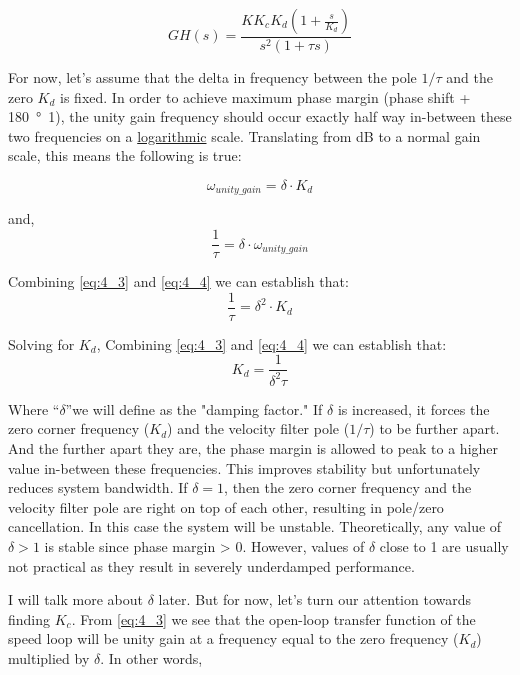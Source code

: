 \begin{equation}\label{eq:4_2}
    GH(s) = \frac{KK_cK_d\left(1+\frac{s}{K_d}\right)}{s^2 \left(1+\tau s\right)}
\end{equation}

For now, let’s assume that the delta in frequency between the pole $1/\tau$ and the zero $K_d$ is fixed.  In order to achieve maximum phase margin (phase shift + \qty{180}{\degree1}), the unity gain frequency should occur exactly half way in-between these two frequencies on a \underline{logarithmic} scale.  Translating from \unit{\dB} to a normal gain scale, this means the following is true:

\begin{equation}\label{eq:4_3}
    \omega_{unity\_gain} = \delta \cdot K_d
\end{equation}

and,
\begin{equation}\label{eq:4_4}
    \frac{1}{\tau} = \delta \cdot \omega_{unity\_gain}
\end{equation}

Combining \ref{eq:4_3} and \ref{eq:4_4} we can establish that:
\begin{equation} \label{eq:4_5}
    \frac{1}{\tau} = \delta^2 \cdot K_d
\end{equation}

Solving for $K_d$,
Combining \ref{eq:4_3} and \ref{eq:4_4} we can establish that:
\begin{equation}\label{eq:4_6}
    K_d = \frac{1}{\delta ^ 2 \tau}
\end{equation}

Where “$\delta$”we will define as the "damping factor."  If $\delta$ is increased, it forces the zero corner frequency ($K_d$) and the velocity filter pole ($1/\tau$) to be further apart.  And the further apart they are, the phase margin is allowed to peak to a higher value in-between these frequencies.  This improves stability but unfortunately reduces system bandwidth.  If $\delta = 1$, then the zero corner frequency and the velocity filter pole are right on top of each other, resulting in pole/zero cancellation.  In this case the system will be unstable.  Theoretically, any value of $\delta > 1$ is stable since phase margin > 0.  However, values of $\delta$ close to 1 are usually not practical as they result in severely underdamped performance.

I will talk more about $\delta$ later.  But for now, let’s turn our attention towards finding $K_c$.  From \ref{eq:4_3} we see that the open-loop transfer function of the speed loop will be unity gain at a frequency equal to the zero frequency ($K_d$) multiplied by $\delta$.  In other words,

